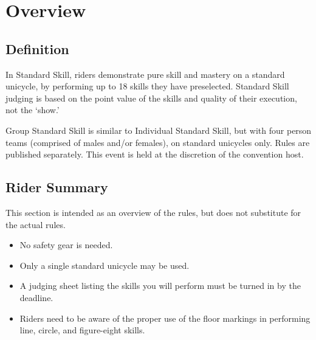 \chapter{Overview}

\section{Definition}

In Standard Skill, riders demonstrate pure skill and mastery on a standard unicycle, by performing up to 18 skills they have preselected.
Standard Skill judging is based on the point value of the skills and quality of their execution, not the `show.'

Group Standard Skill is similar to Individual Standard Skill, but with four person teams (comprised of males and/or females), on standard unicycles only.
Rules are published separately.
This event is held at the discretion of the convention host.

\section{Rider Summary}

This section is intended as an overview of the rules, but does not
substitute for the actual rules.
\begin{itemize}
\item No safety gear is needed.
\item Only a single standard unicycle may be used.
\item A judging sheet listing the skills you will perform must be turned in by the deadline.
\item Riders need to be aware of the proper use of the floor markings in performing line, circle, and figure-eight skills.
\end{itemize}
